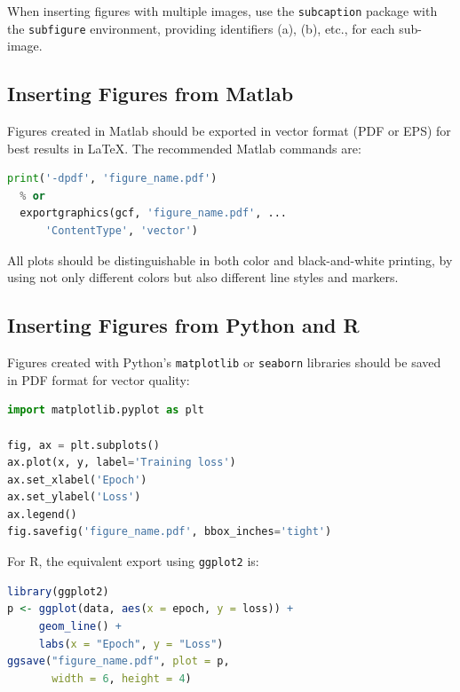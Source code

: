 \documentclass{iteso-irr}
\begin{document}
When inserting figures with multiple images, use the \texttt{subcaption}
package with the \texttt{subfigure} environment, providing identifiers
(a), (b), etc., for each sub-image.

\subsection{Inserting Figures from Matlab}
\label{sec:matlab_figures}

Figures created in Matlab should be exported in vector format (PDF or
EPS) for best results in \LaTeX{}. The recommended Matlab commands are:
%
\begin{lstlisting}[language=Python, caption={Exporting a matplotlib
    figure to PDF.}, label={lst:matplotlib_export}]
  print('-dpdf', 'figure_name.pdf')
  % or
  exportgraphics(gcf, 'figure_name.pdf', ...
      'ContentType', 'vector')
\end{lstlisting}
%
All plots should be distinguishable in both color and black-and-white
printing, by using not only different colors but also different line
styles and markers.

\subsection{Inserting Figures from Python and R}
\label{sec:python_figures}

Figures created with Python's \texttt{matplotlib} or \texttt{seaborn}
libraries should be saved in PDF format for vector quality:
%
\begin{lstlisting}[language=Python, caption={Exporting a matplotlib
    figure to PDF.}, label={lst:matplotlib_export}]
import matplotlib.pyplot as plt

fig, ax = plt.subplots()
ax.plot(x, y, label='Training loss')
ax.set_xlabel('Epoch')
ax.set_ylabel('Loss')
ax.legend()
fig.savefig('figure_name.pdf', bbox_inches='tight')
\end{lstlisting}

\clearpage

For R, the equivalent export using \texttt{ggplot2} is:
%
\begin{lstlisting}[language=R, caption={Exporting a ggplot2 figure
    to PDF.}, label={lst:ggplot_export}]
library(ggplot2)
p <- ggplot(data, aes(x = epoch, y = loss)) +
     geom_line() +
     labs(x = "Epoch", y = "Loss")
ggsave("figure_name.pdf", plot = p,
       width = 6, height = 4)
\end{lstlisting}
\end{document}
